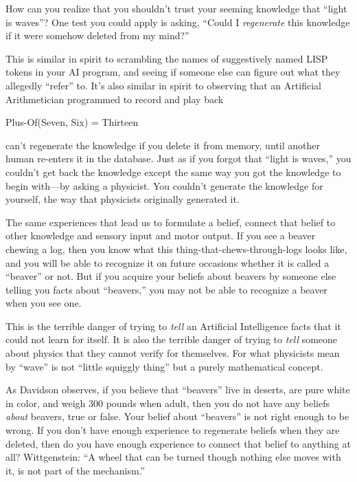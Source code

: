 {
 How can you realize that you shouldn't trust your
seeming knowledge that ``light is
waves''? One test you could apply is asking,
``Could I \textit{regenerate} this knowledge if it
were somehow deleted from my mind?''}

{
 This is similar in spirit to scrambling the names of suggestively
named LISP tokens in your AI program, and seeing if someone else can
figure out what they allegedly
``refer'' to. It's
also similar in spirit to observing that an Artificial Arithmetician
programmed to record and play back}

{\centering
 Plus-Of(Seven, Six) = Thirteen
\par}


\bigskip

{
 can't regenerate the knowledge if you delete it
from memory, until another human re-enters it in the database. Just as
if you forgot that ``light is
waves,'' you couldn't get back the
knowledge except the same way you got the knowledge to begin with---by
asking a physicist. You couldn't generate the knowledge
for yourself, the way that physicists originally generated it. }

{
 The same experiences that lead us to formulate a belief, connect
that belief to other knowledge and sensory input and motor output. If
you see a beaver chewing a log, then you know what this
thing-that-chews-through-logs looks like, and you will be able to
recognize it on future occasions whether it is called a
``beaver'' or not. But if you
acquire your beliefs about beavers by someone else telling you facts
about ``beavers,'' you may not be
able to recognize a beaver when you see one.}

{
 This is the terrible danger of trying to \textit{tell} an
Artificial Intelligence facts that it could not learn for itself. It is
also the terrible danger of trying to \textit{tell} someone about
physics that they cannot verify for themselves. For what physicists
mean by ``wave'' is not
``little squiggly thing'' but a
purely mathematical concept.}

{
 As Davidson observes, if you believe that
``beavers'' live in deserts, are
pure white in color, and weigh 300 pounds when adult, then you do not
have any beliefs \textit{about} beavers, true or false. Your belief
about ``beavers'' is not right
enough to be wrong. If you don't
have enough experience to regenerate beliefs when they are deleted,
then do you have enough experience to connect that belief to anything
at all? Wittgenstein: ``A wheel that can be turned
though nothing else moves with it, is not part of the
mechanism.''}

